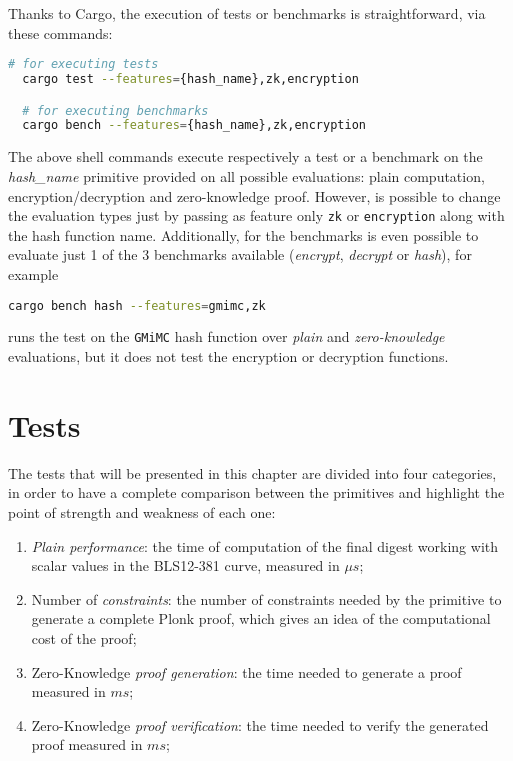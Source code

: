 \documentclass[12pt, a4paper]{report}
\begin{document}
Thanks to Cargo, the execution of tests or benchmarks is straightforward, via these commands:
\begin{lstlisting}[language=bash]
  # for executing tests
  cargo test --features={hash_name},zk,encryption

  # for executing benchmarks
  cargo bench --features={hash_name},zk,encryption
\end{lstlisting}
The above shell commands execute respectively a test or a benchmark on the \textit{hash\_name} primitive provided on all possible evaluations: plain computation, encryption/decryption and zero-knowledge proof.
However, is possible to change the evaluation types just by passing as feature only \texttt{zk} or \texttt{encryption} along with the hash function name.
Additionally, for the benchmarks is even possible to evaluate just 1 of the 3 benchmarks available (\textit{encrypt}, \textit{decrypt} or \textit{hash}), for example
\begin{lstlisting}[language=bash]
  cargo bench hash --features=gmimc,zk
\end{lstlisting}
runs the test on the \texttt{GMiMC} hash function over \textit{plain} and \textit{zero-knowledge} evaluations, but it does not test the encryption or decryption functions.

\chapter{Tests}\label{chap:tests}

The tests that will be presented in this chapter are divided into four categories, in order to have a complete comparison between the primitives and highlight the point of strength and weakness of each one:
\begin{enumerate}
  \item \textit{Plain performance}: the time of computation of the final digest working with scalar values in the BLS12-381 curve, measured in $\mu s$;
  \item Number of \textit{constraints}: the number of constraints needed by the primitive to generate a complete \textsf{Plonk} proof, which gives an idea of the computational cost of the proof;
  \item Zero-Knowledge \textit{proof generation}: the time needed to generate a proof measured in $ms$;
  \item Zero-Knowledge \textit{proof verification}: the time needed to verify the generated proof measured in $ms$;
\end{enumerate}
\end{document}
